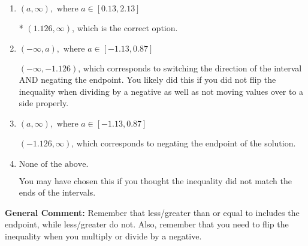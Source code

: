 \documentclass{extbook}[14pt]
\begin{document}
\begin{enumerate}
{\begin{enumerate}[label=\Alph*.]
 $(-\infty, 1.126)$, which corresponds to switching the direction of the interval. You likely did this if you did not flip the inequality when dividing by a negative!
\item \( (a, \infty), \text{ where } a \in [0.13, 2.13] \)

* $(1.126, \infty)$, which is the correct option.
\item \( (-\infty, a), \text{ where } a \in [-1.13, 0.87] \)

 $(-\infty, -1.126)$, which corresponds to switching the direction of the interval AND negating the endpoint. You likely did this if you did not flip the inequality when dividing by a negative as well as not moving values over to a side properly.
\item \( (a, \infty), \text{ where } a \in [-1.13, 0.87] \)

 $(-1.126, \infty)$, which corresponds to negating the endpoint of the solution.
\item \( \text{None of the above}. \)

You may have chosen this if you thought the inequality did not match the ends of the intervals.
\end{enumerate}

\textbf{General Comment:} Remember that less/greater than or equal to includes the endpoint, while less/greater do not. Also, remember that you need to flip the inequality when you multiply or divide by a negative.
}
\end{enumerate}
\end{document}
